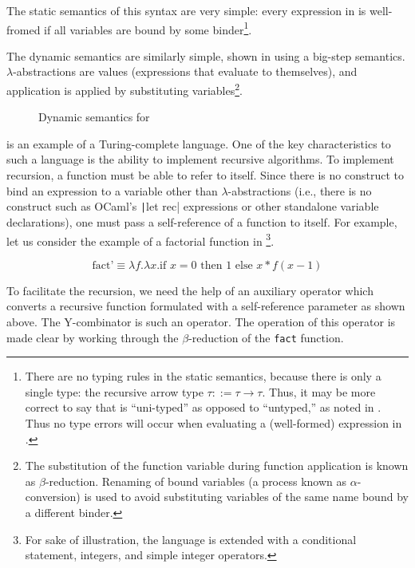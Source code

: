 The static semantics of this syntax are very simple: every expression in \ulc{} is well-fromed if all variables are bound by some binder\footnote{There are no typing rules in the static semantics, because there is only a single type: the recursive arrow type $\tau::=\tau\to\tau$. Thus, it may be more correct to say that \ulc{} is ``uni-typed'' as opposed to ``untyped,'' as noted in \cite{harper2016practical}. Thus no type errors will occur when evaluating a (well-formed) expression in \ulc{}.}.

The dynamic semantics are similarly simple, shown in  using a big-step semantics. $\lambda$-abstractions are values (expressions that evaluate to themselves), and application is applied by substituting variables\footnote{The substitution of the function variable during function application is known as $\beta$-reduction. Renaming of bound variables (a process known as $\alpha$-conversion) is used to avoid substituting variables of the same name bound by a different binder.}.

\begin{figure}
  \centering
  \begin{mdframed}
    \begin{singlespace}
      
    \end{singlespace}
  \end{mdframed}
  \caption{Dynamic semantics for \ulc}
  \label{fig:dynamic-semantics-ulc}
\end{figure}

\ulc{} is an example of a Turing-complete language. One of the key characteristics to such a language is the ability to implement recursive algorithms. To implement recursion, a function must be able to refer to itself. Since there is no construct to bind an expression to a variable other than $\lambda$-abstractions (i.e., there is no construct such as OCaml's \texttt|let rec| expressions or other standalone variable declarations), one must pass a self-reference of a function to itself. For example, let us consider the example of a factorial function in \ulc{}\footnote{For sake of illustration, the language is extended with a conditional statement, integers, and simple integer operators.}.

\[\text{fact'}\equiv\lambda f.\lambda x.\text{if }x=0\text{ then }1\text{ else }x*f(x-1)\]

To facilitate the recursion, we need the help of an auxiliary operator which converts a recursive function formulated with a self-reference parameter as shown above. The Y-combinator is such an operator. The operation of this operator is made clear by working through the $\beta$-reduction of the \texttt{fact} function.

